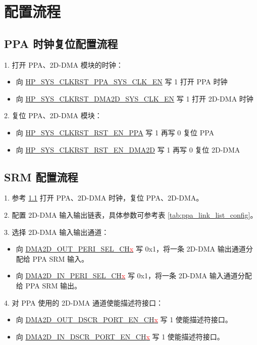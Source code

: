 \documentclass[main\_\_CN.tex]{subfiles}
\begin{document}

\section{配置流程}
\label{sec:ppa-prog-procedures}

\subsection{PPA 时钟复位配置流程}
\label{sec:ppa_clk_rst}
1. 打开 PPA、2D-DMA 模块的时钟：
\begin{itemize}
    \item 向 \hyperref[fielddesc:HPSYSCLKRSTPPASYSCLKEN]{HP\_SYS\_CLKRST\_PPA\_SYS\_CLK\_EN} 写 1 打开 PPA 时钟
    \item 向 \hyperref[fielddesc:HPSYSCLKRSTDMA2DSYSCLKEN]{HP\_SYS\_CLKRST\_DMA2D\_SYS\_CLK\_EN} 写 1 打开 2D-DMA 时钟
\end{itemize}
2. 复位 PPA、2D-DMA 模块：
\begin{itemize}
    \item 向 \hyperref[fielddesc:HPSYSCLKRSTRSTENPPA]{HP\_SYS\_CLKRST\_RST\_EN\_PPA} 写 1 再写 0 复位 PPA
    \item 向 \hyperref[fielddesc:HPSYSCLKRSTRSTENDMA2D]{HP\_SYS\_CLKRST\_RST\_EN\_DMA2D} 写 1 再写 0 复位 2D-DMA
\end{itemize}

\subsection{SRM 配置流程}
1. 参考 \ref{sec:ppa_clk_rst} 打开 PPA、2D-DMA 时钟，复位 PPA、2D-DMA。

2. 配置 2D-DMA 输入输出链表，具体参数可参考表 \ref{tab:ppa_link_list_config}。

3. 选择 2D-DMA 输入输出通道：
\begin{itemize}
    \item 向 \hyperref[fielddesc:DMA2DOUTPERISELCHN]{DMA2D\_OUT\_PERI\_SEL\_CH\textcolor{red}{x}} 写 0x1，将一条 2D-DMA 输出通道分配给 PPA SRM 输入。
    \item 向 \hyperref[fielddesc:DMA2DINPERISELCHN]{DMA2D\_IN\_PERI\_SEL\_CH\textcolor{red}{x}} 写 0x1，将一条 2D-DMA 输入通道分配给 PPA SRM 输出。
\end{itemize}

4. 对 PPA 使用的 2D-DMA 通道使能描述符接口：
\begin{itemize}
    \item 向 \hyperref[fielddesc:DMA2DOUTDSCRPORTENCHN]{DMA2D\_OUT\_DSCR\_PORT\_EN\_CH\textcolor{red}{x}} 写 1 使能描述符接口。
    \item 向 \hyperref[fielddesc:DMA2DINDSCRPORTENCHN]{DMA2D\_IN\_DSCR\_PORT\_EN\_CH\textcolor{red}{x}} 写 1 使能描述符接口。
\end{itemize}
\end{document}
